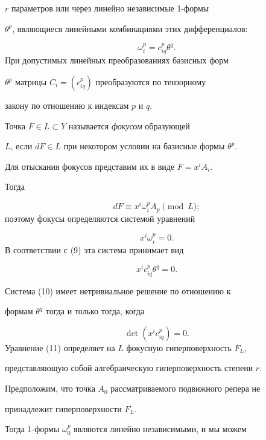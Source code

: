 $r$ параметров или через линейно независимые 1-формы


$\theta^p$, являющиеся линейными комбинациями этих дифференциалов:


\begin{equation}


\label{15}


 \omega_i^p = c_{iq}^p \theta^q.
\end{equation}
 При допустимых линейных преобразованиях базисных форм


$\theta^p$ матрицы $C_i = (c_{iq}^p)$ преобразуются по тензорному


закону по отношению к индексам $p$ и $q$.





Точка $F \in L \subset Y$ называется {\it фокусом} образующей


$L$, если $dF \in L$ при некотором условии на базисные формы $\theta^p$.


Для отыскания фокусов представим их в виде $F = x^i A_i$.


Тогда


$$
dF \equiv x^i \omega_i^p A_p \pmod{L};


$$
поэтому фокусы определяются системой уравнений


$$


x^i \omega_i^p = 0.


$$
В соответствии с (9) эта система принимает вид


\begin{equation}\label{16}
x^i c_{iq}^p \theta^q = 0.
\end{equation}


Система (10) имеет нетривиальное решение по отношению к


формам $\theta^q$ тогда и только тогда, когда


\begin{equation}\label{17}
 \det (x^i c_{iq}^p) = 0.
\end{equation}
Уравнение (11) определяет на $L$ фокусную гиперповерхность $F_L$,


представляющую собой алгебраическую гиперповерхность степени $r$.





Предположим, что точка $A_0$ рассматриваемого подвижного репера не


принадлежит гиперповерхности $F_L$.


Тогда 1-формы $\omega_0^p$ являются линейно независимыми, и мы можем


